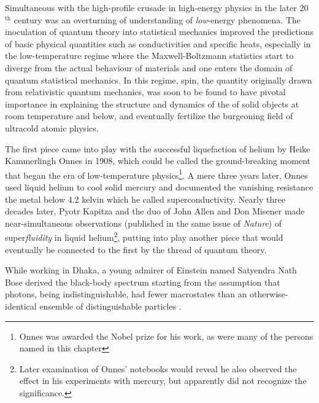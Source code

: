 	Simultaneous with the high-profile crusade in high-energy physics in the later 20$^\textrm{th}$ century was an overturning of understanding of \emph{low}-energy phenomena.
	The inoculation of quantum theory into statistical mechanics improved the predictions of basic physical quantities such as conductivities and specific heats, especially in the low-temperature regime where the Maxwell-Boltzmann statistics start to diverge from the actual behaviour of materials and one enters the domain of quantum statistical mechanics.
	In this regime, spin, the quantity originally drawn from relativistic quantum mechanics, was soon to be found to have pivotal importance in explaining the structure and dynamics of the of solid objects at room temperature and below, and eventually fertilize the burgeoning field of ultracold atomic physics.

	The first piece came into play with the successful liquefaction of helium by Heike Kammerlingh Onnes in 1908, which could be called the ground-breaking moment that began the era of low-temperature physics\footnote{Onnes was awarded the Nobel prize for his work, as were many of the persons named in this chapter}.
	A mere three years later, Onnes used liquid helium to cool solid mercury and documented the vanishing resistance the metal below 4.2 kelvin which he called superconductivity.
	Nearly three decades later, Pyotr Kapitza \cite{Kapitza38} and the duo of John Allen and Don Misener \cite{Allen38} made near-simultaneous observations (published in the same issue of \emph{Nature}) of super\emph{fluidity} in liquid helium\footnote{Later examination of Onnes' notebooks would reveal he also observed the effect in his experiments with mercury, but apparently did not recognize the significance.},  putting into play another piece that would eventually be connected to the first by the thread of quantum theory. 

	While working in Dhaka, a young admirer of Einstein named Satyendra Nath Bose derived the black-body spectrum starting from the assumption that photons, being indistinguishable, had fewer macrostates than an otherwise-identical ensemble of distinguishable particles \cite{Bose24}.

